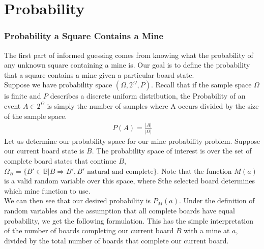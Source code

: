 \section{Probability}\label{sec:probability}

\subsubsection*{Probability a Square Contains a Mine}

The first part of informed guessing comes from knowing what the probability of any unknown square containing a mine is. Our goal is to define the probability that a square contains a mine given a particular board state.\\

Suppose we have probability space $(\Omega,2^{\Omega},P)$. Recall that if the sample space $\Omega$ is finite and $P$ describes a discrete uniform distribution, the Probability of an event $A\in2^{\Omega}$ is simply the number of samples where A occurs divided by the size of the sample space. 
\begin{align*}
    P(A)=\frac{|A|}{|\Omega|}
\end{align*}
Let us determine our probability space for our mine probability problem. Suppose our current board state is $B$. The probability space of interest is over the set of complete board states that continue $B$, $\Omega_B=\{B'\in\mathbb{B}|B\Rightarrow B',B'\text{ natural and complete}\}$. Note that the function $M(a)$ is a valid random variable over this space, where Sthe selected board determines which mine function to use.\\

We can then see that our desired probability is $P_M(a)$. Under the definition of random variables and the assumption that all complete boards have equal probability, we get the following formulation.
This has the simple interpretation of the number of boards completing our current board $B$ with a mine at $a$, divided by the total number of boards that complete our current board.\\


